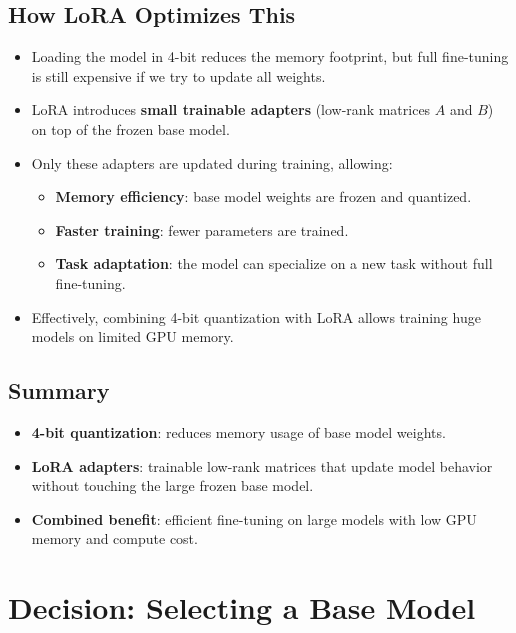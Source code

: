 \subsection{How LoRA Optimizes This}

\begin{itemize}
    \item Loading the model in 4-bit reduces the memory footprint, but full fine-tuning is still expensive if we try to update all weights.
    \item LoRA introduces \textbf{small trainable adapters} (low-rank matrices $A$ and $B$) on top of the frozen base model.
    \item Only these adapters are updated during training, allowing:
    \begin{itemize}
        \item \textbf{Memory efficiency}: base model weights are frozen and quantized.
        \item \textbf{Faster training}: fewer parameters are trained.
        \item \textbf{Task adaptation}: the model can specialize on a new task without full fine-tuning.
    \end{itemize}
    \item Effectively, combining 4-bit quantization with LoRA allows training huge models on limited GPU memory.
\end{itemize}

\subsection{Summary}

\begin{tcolorbox}[colback=blue!5!white,colframe=blue!75!black,title=Takeaway]
\begin{itemize}
    \item \textbf{4-bit quantization}: reduces memory usage of base model weights.
    \item \textbf{LoRA adapters}: trainable low-rank matrices that update model behavior without touching the large frozen base model.
    \item \textbf{Combined benefit}: efficient fine-tuning on large models with low GPU memory and compute cost.
\end{itemize}
\end{tcolorbox}

\newpage

\section{Decision: Selecting a Base Model}

